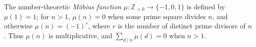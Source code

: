 
The number-theoretic \emph{Möbius function} $\mu:\mathbb Z_{>0}\to\{-1,0,1\}$ is defined by $\mu(1)=1$; for $n>1$, $\mu(n)=0$ when some prime square divides $n$, and otherwise $\mu(n)=(-1)^r$, where $r$ is the number of distinct prime divisors of $n$. Thus $\mu(n)$ is multiplicative, and $\sum_{d\mid n}\mu(d)=0$ when $n>1$.
